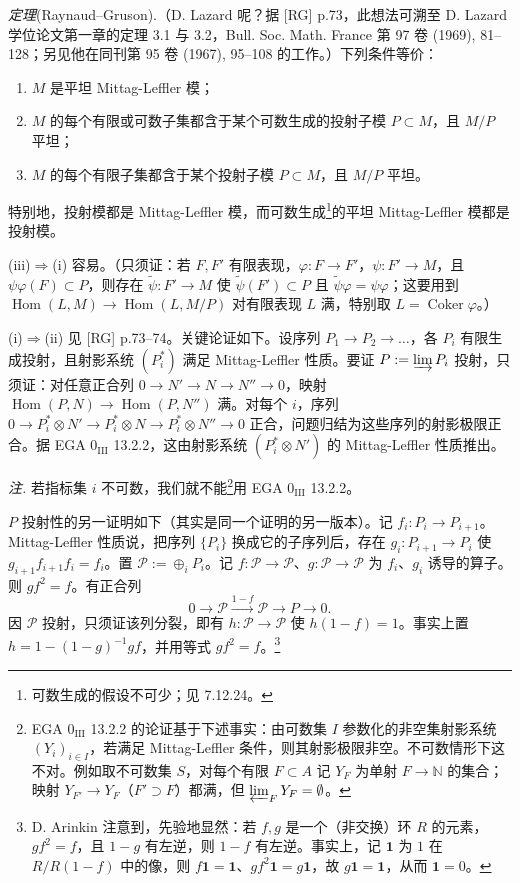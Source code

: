  \emph{定理}(Raynaud--Gruson).（D. Lazard 呢？据 [RG] p.73，此想法可溯至 D. Lazard 学位论文第一章的定理 3.1 与 3.2，Bull. Soc. Math. France 第 97 卷 (1969), 81--128；另见他在同刊第 95 卷 (1967), 95--108 的工作。）下列条件等价：
\begin{enumerate}[label=(\roman*),leftmargin=2.2em]
\item $M$ 是平坦 Mittag-Leffler 模；
%
\item $M$ 的每个有限或可数子集都含于某个可数生成的投射子模 $P\subset M$，且 $M/P$ 平坦；
\item $M$ 的每个有限子集都含于某个投射子模 $P\subset M$，且 $M/P$ 平坦。
\end{enumerate}

特别地，投射模都是 Mittag-Leffler 模，而可数生成\footnote{可数生成的假设不可少；见 7.12.24。}的平坦 Mittag-Leffler 模都是投射模。

(iii)$\Rightarrow$(i) 容易。（只须证：若 $F,F'$ 有限表现，$\varphi:F\to F'$，$\psi:F'\to M$，且 $\psi\varphi(F)\subset P$，则存在 $\tilde\psi:F'\to M$ 使 $\tilde\psi(F')\subset P$ 且 $\tilde\psi\varphi=\psi\varphi$；这要用到 $\operatorname{Hom}(L,M)\to\operatorname{Hom}(L,M/P)$ 对有限表现 $L$ 满，特别取 $L=\operatorname{Coker}\varphi$。）

(i)$\Rightarrow$(ii) 见 [RG] p.73--74。关键论证如下。设序列 $P_1\to P_2\to\ldots$，各 $P_i$ 有限生成投射，且射影系统 $(P^{*}_i)$ 满足 Mittag-Leffler 性质。要证 $P:=\varinjlim P_i$ 投射，只须证：对任意正合列 $0\to N'\to N\to N''\to 0$，映射 $\operatorname{Hom}(P,N)\to\operatorname{Hom}(P,N'')$ 满。对每个 $i$，序列 $0\to P^{*}_i\otimes N'\to P^{*}_i\otimes N\to P^{*}_i\otimes N''\to 0$ 正合，问题归结为这些序列的射影极限正合。据 EGA $0_{\mathrm{III}}$ 13.2.2，这由射影系统 $(P^{*}_i\otimes N')$ 的 Mittag-Leffler 性质推出。

\emph{注.} 若指标集 $i$ 不可数，我们就不能\footnote{EGA $0_{\mathrm{III}}$ 13.2.2 的论证基于下述事实：由可数集 $I$ 参数化的非空集射影系统 $(Y_i)_{i\in I}$，若满足 Mittag-Leffler 条件，则其射影极限非空。不可数情形下这不对。例如取不可数集 $S$，对每个有限 $F\subset A$ 记 $Y_F$ 为单射 $F\to\mathbb{N}$ 的集合；映射 $Y_{F'}\to Y_F$（$F'\supset F$）都满，但 $\varprojlim_F Y_F=\emptyset$。}用 EGA $0_{\mathrm{III}}$ 13.2.2。


$P$ 投射性的另一证明如下（其实是同一个证明的另一版本）。记 $f_i:P_i\to P_{i+1}$。Mittag-Leffler 性质说，把序列 $\{P_i\}$ 换成它的子序列后，存在 $g_i:P_{i+1}\to P_i$ 使 $g_{i+1}f_{i+1}f_i=f_i$。置 $\mathcal{P}:=\oplus_i P_i$。记 $f:\mathcal{P}\to\mathcal{P}$、$g:\mathcal{P}\to\mathcal{P}$ 为 $f_i$、$g_i$ 诱导的算子。则 $gf^2=f$。有正合列
\[
0\to\mathcal{P}\xrightarrow{1-f}\mathcal{P}\to P\to 0.
\]
因 $\mathcal{P}$ 投射，只须证该列分裂，即有 $h:\mathcal{P}\to\mathcal{P}$ 使 $h(1-f)=1$。事实上置 $h=1-(1-g)^{-1}gf$，并用等式 $gf^2=f$。\footnote{D. Arinkin 注意到，先验地显然：若 $f,g$ 是一个（非交换）环 $R$ 的元素，$gf^2=f$，且 $1-g$ 有左逆，则 $1-f$ 有左逆。事实上，记 $\mathbf{1}$ 为 $1$ 在 $R/R(1-f)$ 中的像，则 $f\mathbf{1}=\mathbf{1}$、$gf^2\mathbf{1}=g\mathbf{1}$，故 $g\mathbf{1}=\mathbf{1}$，从而 $\mathbf{1}=0$。}

